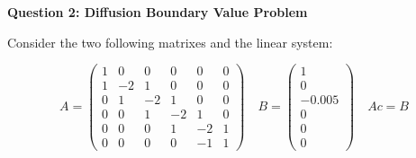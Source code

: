 \documentclass{article}
\begin{document}
\textbf{Question 2: Diffusion Boundary Value Problem}

Consider the two following matrixes and the linear system:

\begin{equation}
A = \left( \begin{array}{cccccc}
    1 & 0 & 0 & 0 & 0 & 0 \\
    1 & -2 & 1 & 0 & 0 & 0 \\
    0 & 1 & -2 & 1  & 0 & 0 \\
    0 & 0 & 1 & -2 & 1  & 0 \\
    0 & 0 & 0 & 1 & -2 & 1  \\
    0 & 0 & 0 & 0 & -1 & 1 
\end{array}
\right) \quad B = \left( \begin{array}{c}
    1  \\
    0 \\
    -0.005 \\
    0  \\
    0  \\
    0  
\end{array} \right)  \quad Ac=B
\end{equation} 
\end{document}
